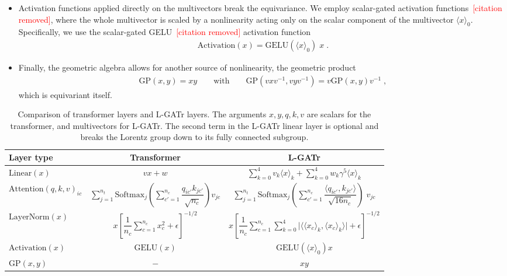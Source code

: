 \documentclass[submission, Phys]{SciPost}
\begin{document}
\begin{itemize}
\item Activation functions applied directly on the multivectors break the equivariance. We employ scalar-gated activation functions\textcolor{red}{~[citation removed]}, where the whole multivector is scaled by a nonlinearity acting only on the scalar component of the multivector $\langle x\rangle_0$. Specifically, we use the scalar-gated GELU\textcolor{red}{~[citation removed]} activation function
%
\begin{align}
    \text{Activation}(x) = \text{GELU}(\langle x\rangle_0 ) \; x \; .
\end{align}

\item Finally, the geometric algebra allows for another source of nonlinearity, the geometric product
%
\begin{align}
    \text{GP}(x,y) = xy
    \qquad \text{with} \qquad 
    \text{GP}(vxv^{-1}, vyv^{-1}) = v\text{GP}(x,y)v^{-1} \; ,
\end{align}
%
which is equivariant itself. 
\end{itemize}

\begin{table}[t]
    \centering
    \begin{small} \begin{tabular}{l c c}
        \toprule
        Layer type & Transformer & L-GATr \\[1mm]
        \midrule
        $\text{Linear}(x)$ & $v x + w$ & $\sum_{k=0}^4 v_k\langle x\rangle_k + \sum_{k=0}^4 w_k \gamma^5 \langle x\rangle_k$ \\[2mm]
        $\text{Attention}(q,k,v)_{ic}$ & $\sum_{j=1}^{n_t} \text{Softmax}_j\left(\sum_{c'=1}^{n_c}\dfrac{q_{ic'}k_{jc'}}{\sqrt{n_c}}\right) v_{jc}$ & $\sum_{j=1}^{n_t} \text{Softmax}_j \left( \sum_{c'=1}^{n_c}\dfrac {\langle q_{ic'}, k_{jc'}\rangle} {\sqrt{16n_c}} \right) \; v_{jc}$ \\[4mm]
        $\text{LayerNorm}(x)$ & $x \left[ \dfrac{1}{n_c}\sum_{c=1}^{n_c} x_c^2 + \epsilon \right]^{-1/2}$ &  $x\left[ \dfrac{1}{n_c} \sum_{c=1}^{n_c} \sum_{k=0}^4 \Big\rvert \Big\langle \langle x_c \rangle_k, \langle x_c\rangle_k \Big\rangle \Big\rvert + \epsilon \right]^{-1/2}$ \\[4mm]
        $\text{Activation}(x)$ & $\text{GELU}(x)$ & $\text{GELU}(\langle x\rangle_0) x$ \\[2mm]
        $\text{GP}(x, y)$ & $-$ & $xy$ \\
        \bottomrule
    \end{tabular} \end{small}
    \caption{Comparison of transformer layers and L-GATr layers. The arguments $x, y, q, k, v$ are scalars for the transformer, and multivectors for L-GATr. The second term in the L-GATr linear layer is optional and breaks the Lorentz group down to its fully connected subgroup.} 
    \label{tab:layers}
\end{table}
\end{document}
